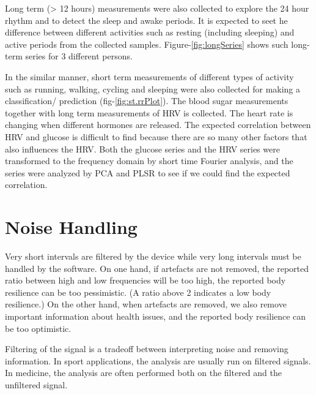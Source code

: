 \documentclass[a4paper, 11pt]{report}\usepackage[]{graphicx}\usepackage[]{color}
\makeatletter
\def\maxwidth{ %
  \ifdim\Gin@nat@width>\linewidth
    \linewidth
  \else
    \Gin@nat@width
  \fi
}
\numberwithin{figure}{section}
\makeatother
\begin{document}

Long term (> 12 hours) measurements were also collected to explore the 24 hour rhythm and to detect the sleep and awake periods. It is expected to seet he difference between different activities such as resting (including sleeping) and active periods from the collected samples. Figure-\ref{fig:longSeries} shows such long-term series for 3 different persons.

In the similar manner, short term measurements of different types of activity such as running, walking, cycling and sleeping were also collected for making a classification/ prediction (fig-\ref{fig:st.rrPlot}). The blood sugar measurements together with long term measurements of HRV is collected. The heart rate is changing when different hormones are released. The expected correlation between HRV and glucose is difficult to find because there are so many other factors that also influences the HRV. Both the glucose series and the HRV series were transformed to the frequency domain by short time Fourier analysis, and the series were analyzed by PCA and PLSR to see if we could find the expected correlation.


\section{Noise Handling}
Very short intervals are filtered by the device while very long intervals must be handled by the software. On one hand, if artefacts are not removed, the reported ratio between high and low frequencies will be too high, the reported body resilience can be too pessimistic. (A ratio above 2 indicates a low body resilience.) On the other hand, when artefacts are removed, we also remove important information about health issues, and the reported body resilience can be too optimistic.

Filtering of the signal is a tradeoff between interpreting noise and removing information. In sport applications, the analysis are usually run on filtered signals. In medicine, the analysis are often performed both on the filtered and the unfiltered signal.
\end{document}
